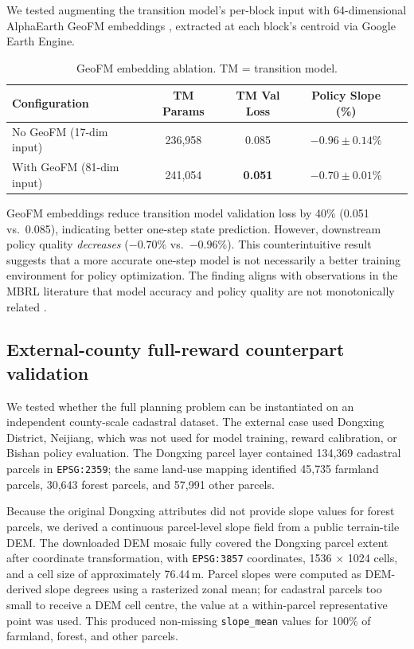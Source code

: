 \documentclass[11pt]{article}
\begin{document}
We tested augmenting the transition model's per-block input with 64-dimensional AlphaEarth GeoFM embeddings \citep{brown2025alphaearth}, extracted at each block's centroid via Google Earth Engine.

\begin{table}[htbp]
\centering
\caption{GeoFM embedding ablation. TM = transition model.}
\label{tab:e4}
\begin{tabular}{lcccc}
\toprule
Configuration & TM Params & TM Val Loss & Policy Slope (\%) \\
\midrule
No GeoFM (17-dim input)      & 236{,}958 & 0.085 & $-0.96 \pm 0.14\%$ \\
With GeoFM (81-dim input)    & 241{,}054 & \textbf{0.051} & $-0.70 \pm 0.01\%$ \\
\bottomrule
\end{tabular}
\end{table}

GeoFM embeddings reduce transition model validation loss by 40\% (0.051 vs.\ 0.085), indicating better one-step state prediction. However, downstream policy quality \textit{decreases} ($-0.70\%$ vs.\ $-0.96\%$). This counterintuitive result suggests that a more accurate one-step model is not necessarily a better training environment for policy optimization. The finding aligns with observations in the MBRL literature that model accuracy and policy quality are not monotonically related \citep{lambert2022investigating}.

\subsection{External-county full-reward counterpart validation}
\label{sec:external_validation}

We tested whether the full planning problem can be instantiated on an independent county-scale cadastral dataset. The external case used Dongxing District, Neijiang, which was not used for model training, reward calibration, or Bishan policy evaluation. The Dongxing parcel layer contained 134{,}369 cadastral parcels in \texttt{EPSG:2359}; the same land-use mapping identified 45{,}735 farmland parcels, 30{,}643 forest parcels, and 57{,}991 other parcels.

Because the original Dongxing attributes did not provide slope values for forest parcels, we derived a continuous parcel-level slope field from a public terrain-tile DEM. The downloaded DEM mosaic fully covered the Dongxing parcel extent after coordinate transformation, with \texttt{EPSG:3857} coordinates, 1536 $\times$ 1024 cells, and a cell size of approximately 76.44\,m. Parcel slopes were computed as DEM-derived slope degrees using a rasterized zonal mean; for cadastral parcels too small to receive a DEM cell centre, the value at a within-parcel representative point was used. This produced non-missing \texttt{slope\_mean} values for 100\% of farmland, forest, and other parcels.
\end{document}
